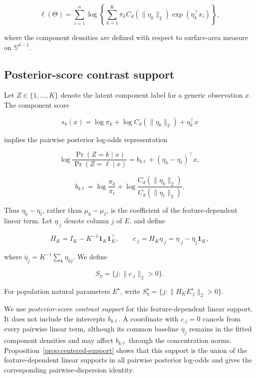 \documentclass[preprint,12pt,authoryear]{elsarticle}
\begin{document}
\[
\ell(\Theta)
=\sum_{i=1}^n\log\left\{
\sum_{k=1}^K\pi_k C_d(\lVert\eta_k\rVert_2)
\exp(\eta_k^\top x_i)\right\},
\]

where the component densities are defined with respect to surface-area
measure on $\mathbb S^{d-1}$.

\subsection{Posterior-score contrast support}

Let $Z\in\{1,\ldots,K\}$ denote the latent component label for a generic
observation $x$. The component score

\[
s_k(x)=\log\pi_k+\log C_d(\lVert\eta_k\rVert_2)+\eta_k^\top x
\]

implies the pairwise posterior log-odds representation

\[
\log\frac{\Pr(Z=k\mid x)}{\Pr(Z=\ell\mid x)}
=b_{k\ell}+(\eta_k-\eta_\ell)^\top x,
\]

\[
b_{k\ell}
=\log\frac{\pi_k}{\pi_\ell}
+\log\frac{C_d(\lVert\eta_k\rVert_2)}
{C_d(\lVert\eta_\ell\rVert_2)}.
\]

Thus $\eta_k-\eta_\ell$, rather than $\mu_k-\mu_\ell$, is the coefficient
of the feature-dependent linear term. Let $\eta_{\cdot j}$ denote column $j$
of $E$, and define

\[
H_K=I_K-K^{-1}\mathbf1_K\mathbf1_K^\top,
\qquad
c_{\cdot j}=H_K\eta_{\cdot j}
=\eta_{\cdot j}-\bar\eta_j\mathbf1_K,
\]

where $\bar\eta_j=K^{-1}\sum_k\eta_{kj}$. We define

\[
S_{\eta}
=\{j:\lVert c_{\cdot j}\rVert_2>0\}.
\]

For population natural parameters $E^\star$, write
$S_\eta^\star=\{j:\lVert H_KE^\star_{\cdot j}\rVert_2>0\}$.

We use \emph{posterior-score contrast support} for this feature-dependent
linear support. It does not include the intercepts
$b_{k\ell}$. A coordinate with $c_{\cdot j}=0$ cancels from every pairwise
linear term, although its common baseline $\bar\eta_j$ remains in the fitted
component densities and may affect $b_{k\ell}$ through the concentration
norms. Proposition~\ref{prop:centered-support} shows that this support is the
union of the feature-dependent linear supports in all pairwise posterior
log-odds and gives the corresponding pairwise-dispersion identity.
\end{document}
